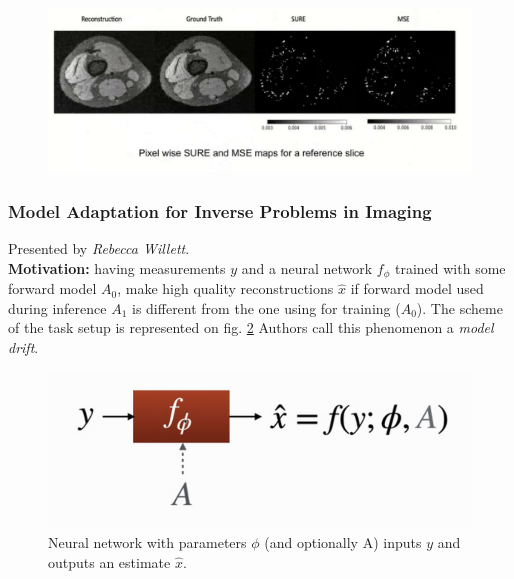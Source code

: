 \begin{figure}[h!]
    \centering
    \includegraphics[scale=0.4]{neurips-2020/images/Screenshot 2020-12-12 at 17.26.28.png}
    \label{fig:sure-result}
\end{figure}





\subsubsection{Model Adaptation for Inverse Problems in Imaging \cite{gilton2020model}}

Presented by \textit{Rebecca Willett}. \\

{\bf Motivation:} having measurements $y$ and a neural network $f_{\phi}$ trained with some forward model $A_0$, make high quality reconstructions $\hat{x}$ if forward model used during inference $A_1$ is different from the one using for training ($A_0$). 
The scheme of the task setup is represented on fig. \ref{fig:inv_prob_setup}
Authors call this phenomenon a \textit{model drift}. \\

\begin{figure}[h!]
    \centering
    \includegraphics[scale=0.3]{neurips-2020/images/Screenshot 2020-12-13 at 20.44.08.png}
    \caption{Neural network with parameters $\phi$ (and optionally A) inputs $y$ and outputs an estimate $\hat{x}$.}
    \label{fig:inv_prob_setup}
\end{figure} 

